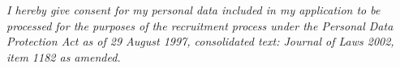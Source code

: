 \documentclass[letterpaper]{twentysecondcv} %
\begin{document}
\pagebreak
{}
\setlength{\parindent}{15pt} 

\par \large \textit{I hereby give consent for my personal data included in my application to be processed for the purposes of the recruitment process under the Personal Data Protection Act as of 29 August 1997, consolidated text: Journal of Laws 2002, item 1182 as amended.}
\end{document}
